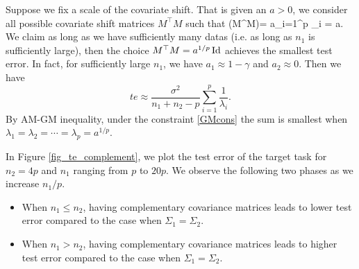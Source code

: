 {\color{blue}
Suppose we fix a scale of the covariate shift. That is given an $a>0$, we consider all possible covariate shift matrices $M^\top M$ such that 
\be\label{GMcons}\det(M^\top M)= a\Leftrightarrow \prod_{i=1}^p \lambda_i = a.\ee
We claim as long as we have sufficiently many datas (i.e. as long as $n_1$ is sufficiently large), then the choice $M^\top M = a^{1/p}\operatorname{Id} $ achieves the smallest test error. In fact, for sufficiently large $n_1$, we have $a_1\approx 1-\gamma$ and $a_2\approx 0$. Then we have 
$$te\approx \frac{\sigma^2}{n_1+n_2-p} \sum_{i=1}^p \frac{1}{\lambda_i}.$$
By AM-GM inequality, under the constraint \eqref{GMcons} the sum is smallest when $\lambda_1=\lambda_2=\cdots=\lambda_p = a^{1/p}$. 
}


In Figure \ref{fig_te_complement}, we plot the test error of the target task for $n_2 = 4p$ and $n_1$ ranging from $p$ to $20p$.
We observe the following two phases as we increase $n_1 / p$.
\begin{itemize}
	\item When $n_1 \le n_2$, having complementary covariance matrices leads to lower test error compared to the case when $\Sigma_1 = \Sigma_2$.
	\item When $n_1 > n_2$, having complementary covariance matrices leads to higher test error compared to the case when $\Sigma_1 = \Sigma_2$.
\end{itemize}

